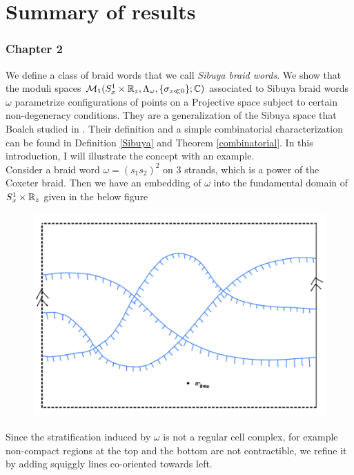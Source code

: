 \section{Summary of results}\label{sec_summary_of_results}

\subsubsection*{Chapter 2}

We define a class of braid words that we call \emph{Sibuya braid words}. We show that the moduli spaces $\mathcal{M}_1(S^1_x \times \mathbb{R}_z, \Lambda_\omega, \{\sigma_{z\ll 0}\};\mathbb{C})$ associated to Sibuya braid words $\omega$ parametrize configurations of points on a Projective space subject to certain non-degeneracy conditions. They are a generalization of the Sibuya space that Boalch studied in \cite{sibuya1975global}\cite{boalch2015wild}. Their definition and a simple combinatorial characterization can be found in  Definition \ref{Sibuya} and Theorem \ref{combinatorial}. In this introduction, I will illustrate the concept with an example.\\ 
Consider a braid word $\omega =(s_1 s_2)^2$ on $3$ strands, which is a power of the Coxeter braid. Then we have an embedding of $\omega$ into the fundamental domain of $S^1_x\times \mathbb{R}_z$ given in the below figure
\begin{figure}[H] 
    \centering
    \includegraphics[scale = 0.55]{diagrams/intro/7.png}
    \caption{}
    \label{fig:your-label}
\end{figure}
Since the stratification induced by $\omega$ is not a regular cell complex, for example non-compact regions at the top and the bottom are not contractible, we refine it by adding squiggly lines co-oriented towards left.
